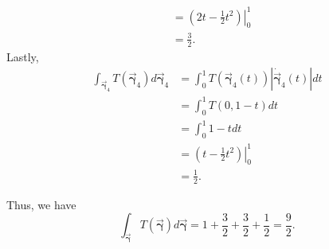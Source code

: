\documentclass[12pt]{article} %
\newcommand{\curvegamma}{\boldsymbol{\vec{\gamma}}}
\newcommand{\tangentgamma}{\boldsymbol{\dot{\vec{\gamma}}}}
\begin{document}
\begin{solution}
\begin{enumerate}[(a)]
\begin{align*}
				&= \left.\left( 2t-\frac{1}{2}t^2\right)\right\vert_0^1\\
				&= \frac{3}{2}.
		\end{align*}			
		Lastly,
		\begin{align*}
			\int_{\curvegamma_4} T(\curvegamma_4) d\curvegamma_4 &= \int_0^1 T(\curvegamma_4(t))\left|\tangentgamma_4(t)\right|dt\\
			&= \int_0^1 T(0,1-t) dt\\
			&= \int_0^1 1-t dt\\
			&= \left.\left(t-\frac{1}{2}t^2\right)\right\vert_0^1\\
			&= \frac{1}{2}.
		\end{align*}	
	\end{enumerate}
	Thus, we have
	\[
	\boxed{\int_{\curvegamma} T(\curvegamma) d\curvegamma = 1+\frac{3}{2}+\frac{3}{2}+\frac{1}{2} = \frac{9}{2}.}
	\]
\end{solution}
\end{document}
